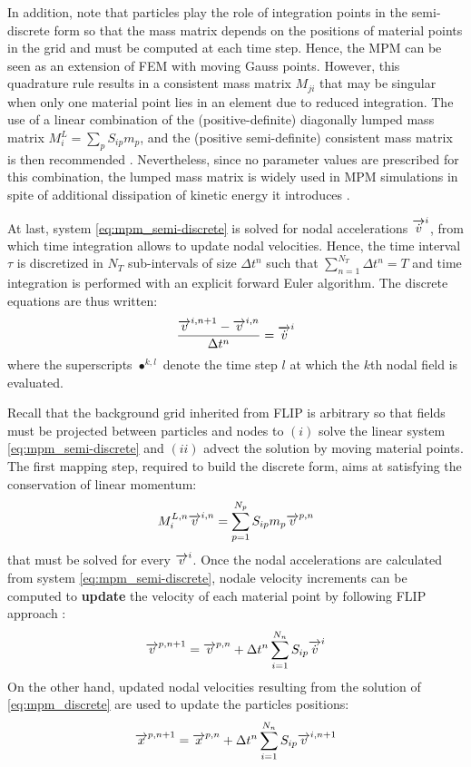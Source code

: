 In addition, note that particles play the role of integration points in the semi-discrete form so that the mass matrix depends on the positions of material points in the grid and must be computed at each time step. Hence, the MPM can be seen as an extension of FEM with moving Gauss points. However, this quadrature rule results in a consistent mass matrix $M_{ji}$ that may be singular when only one material point lies in an element due to reduced integration. The use of a linear combination of the (positive-definite) diagonally lumped mass matrix $M^L_i=\sum_p S_{ip}m_p$, and the (positive semi-definite) consistent mass matrix is then recommended \cite{Love}. Nevertheless, since no parameter values are prescribed for this combination, the lumped mass matrix is widely used in MPM simulations in spite of additional dissipation of kinetic energy it introduces \cite{Mass_Flip}. 

At last, system \eqref{eq:mpm_semi-discrete} is solved for nodal accelerations ${\overrightarrow{\dot{v}}}^i$, from which time integration allows to update nodal velocities. Hence, the time interval $\tau$ is discretized in $N_T$ sub-intervals of size $\Delta t^n$ such that $\sum_{n=1}^{N_T} \Delta t^n = T$ and time integration is performed with an explicit forward Euler algorithm. The discrete equations are thus written:
\begin{equation}
  \label{eq:mpm_discrete}
  \frac{{\overrightarrow{v}}^{i,n+1}-{\overrightarrow{v}}^{i,n}}{\Delta t^n} = {\overrightarrow{\dot{v}}}^i
\end{equation}
where the superscripts $\bullet^{k,l}$ denote the time step $l$ at which the $k$th nodal field is evaluated. 

Recall that the background grid inherited from FLIP is arbitrary so that fields must be projected between particles and nodes to $(i)$ solve the linear system \eqref{eq:mpm_semi-discrete} and $(ii)$ advect the solution by moving material points. The first mapping step, required to build the discrete form, aims at satisfying the conservation of linear momentum:
\begin{equation}
  \label{eq:particles2nodes}
  M^{L,n}_i {\overrightarrow{v}}^{i,n} = \sum_{p=1}^{N_p} S_{ip}m_p {\overrightarrow{v}}^{p,n}
\end{equation}
that must be solved for every ${\overrightarrow{v}}^i$. Once the nodal accelerations are calculated from system \eqref{eq:mpm_semi-discrete}, nodale velocity increments can be computed to \textbf{update} the velocity of each material point by following FLIP approach \cite{PIC_Nishiguchi}:
\begin{equation}
  \label{eq:mp_velocity_update}
  {\overrightarrow{v}}^{p,n+1}= {\overrightarrow{v}}^{p,n}+ \Delta t^n \sum_{i=1}^{N_n} S_{ip}{\overrightarrow{\dot{v}}}^{i}
\end{equation}
On the other hand, updated nodal velocities resulting from the solution of \eqref{eq:mpm_discrete} are used to update the particles positions:
\begin{equation}
  \label{eq:position_update}
  {\overrightarrow{x}}^{p,n+1}={\overrightarrow{x}}^{p,n} + \Delta t^n\sum_{i=1}^{N_n} S_{ip}{\overrightarrow{v}}^{i,n+1} 
\end{equation}

